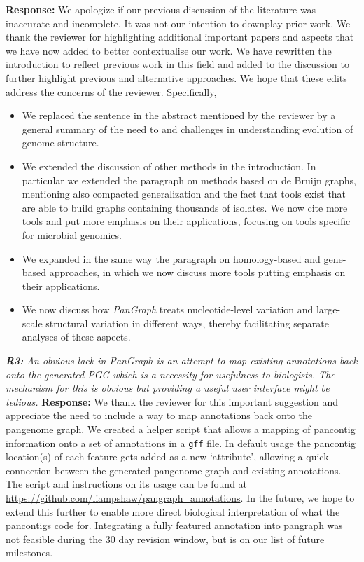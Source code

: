 \documentclass[aps,rmp,onecolumn]{revtex4-1}
\newcommand{\reviewer}[2]{{\it \textbf{#1:} #2\vskip 5mm}}
\newcommand{\response}[1]{{{\color{response}\textbf{Response:} #1}}\vskip 5mm}
\begin{document}
\response{
      We apologize if our previous discussion of the literature was inaccurate and incomplete. It was not our intention to downplay prior work.
      We thank the reviewer for highlighting additional important papers and aspects that we have now added to better contextualise our work.
      We have rewritten the introduction to reflect previous work in this field and added to the discussion to further highlight previous and alternative approaches. We hope that these edits address the concerns of the reviewer.
      Specifically, 
\begin{itemize}
    \item We replaced the sentence in the abstract mentioned by the reviewer by a general summary of the need to and challenges in understanding evolution of genome structure.
    \item We extended the discussion of other methods in the introduction.
    In particular we extended the paragraph on methods based on de Bruijn graphs, mentioning also compacted generalization and the fact that tools exist that are able to build graphs containing thousands of isolates. We now cite more tools and put more emphasis on their applications, focusing on tools specific for microbial genomics. 
    \item We expanded in the same way the paragraph on homology-based and gene-based approaches, in which we now discuss more tools putting emphasis on their applications.
    \item We now discuss how \textit{PanGraph} treats nucleotide-level variation and large-scale structural variation in different ways, thereby facilitating separate analyses of these aspects. 
\end{itemize}
}

\reviewer{R3}{An obvious lack in PanGraph is an attempt to map existing annotations back onto the generated PGG which is a necessity for usefulness to biologists. The mechanism for this is obvious but providing a useful user interface might be tedious.}
\response{We thank the reviewer for this important suggestion and appreciate the need to include a way to map annotations back onto the pangenome graph. 
We created a helper script that allows a mapping of pancontig information onto a set of annotations in a \texttt{gff} file. 
In default usage the pancontig location(s) of each feature gets added as a new `attribute', allowing a quick connection between the generated pangenome graph and existing annotations. 
The script and instructions on its usage can be found at \url{https://github.com/liampshaw/pangraph\_annotations}. 
In the future, we hope to extend this further to enable more direct biological interpretation of what the pancontigs code for. 
Integrating a fully featured annotation into pangraph was not feasible during the 30 day revision window, but is on our list of future milestones. 
}
\end{document}
